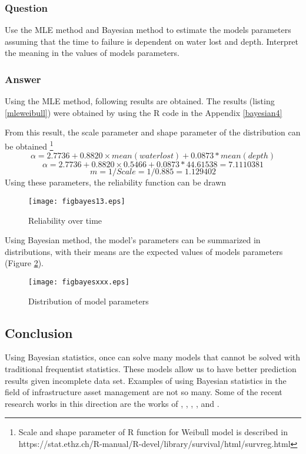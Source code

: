 \subsubsection{Question}
Use the MLE method and Bayesian method to estimate the models parameters assuming that the time to failure is dependent on water lost and depth. Interpret the meaning in the values of models parameters. 
\subsubsection{Answer}
Using the MLE method, following results are obtained. The results (listing \ref{mleweibull}) were obtained by using the R code in the Appendix \ref{bayesian4}



From this result, the scale parameter and shape parameter of the distribution can be obtained \footnote{Scale and shape parameter of R function for Weibull model is described in \\https://stat.ethz.ch/R-manual/R-devel/library/survival/html/survreg.html}
\[
 \alpha = 2.7736+0.8820 \times mean(waterlost)+0.0873*mean(depth) 
 \]
\[
 \alpha = 2.7736+0.8820 \times 0.5466+0.0873*44.61538 = 7.1110381 
\]
\[
 m=1/Scale = 1/0.885=1.129402
\]
Using these parameters, the reliability function can be drawn 
\begin{figure}[h]
\begin{center}
\texttt{[image: figbayes13.eps]}
\caption{Reliability over time}\label{figbayes13}
\end{center}
\end{figure}

Using Bayesian method, the model's parameters can be summarized in distributions, with their means are the expected values of models parameters (Figure \ref{figbayesxxx}).

\begin{figure}[h]
\begin{center}
\texttt{[image: figbayesxxx.eps]}
\caption{Distribution of model parameters}\label{figbayesxxx}
\end{center}
\end{figure}
\subsection{Conclusion}
Using Bayesian statistics, once can solve many models that cannot be solved with traditional frequentist statistics. These models allow us to have better prediction results given incomplete data set. Examples of using Bayesian statistics in the field of infrastructure asset management are not so many. Some of the recent research works in this direction are the works of \cite{Hong2006}, \cite{Gao2012}, \cite{Kobayashi2012}, \cite{Kobayashi2014}, and \cite{Lethanh2015b}.
